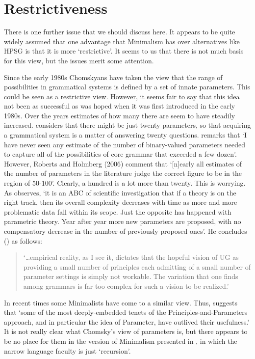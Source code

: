 \documentclass[output=paper]{langsci/langscibook}
\begin{document}
\section{Restrictiveness}
\label{sec:min-restrictive}

There is one further issue that we should discuss here. It appears to be quite widely assumed that one advantage that Minimalism has over alternatives like HPSG is that it is more `restrictive'. It seems to us that there is not much basis for this view, but the issues merit some attention.

Since the early 1980s Chomskyans have taken the view that the range of possibilities in grammatical systems is defined by a set of innate parameters. This could be seen as a restrictive view. However, it seems fair to say that this idea not been as successful as was hoped when it was first introduced in the early 1980s. Over the years estimates of how many there are seem to have steadily increased. \citet{Fodor.2001b} considers that there might be just twenty parameters, so that acquiring a grammatical system is a matter of answering twenty questions. \citet[44]{Newmeyer2005a} remarks that `I have never seen any estimate of the number of binary-valued parameters needed to capture all of the possibilities of core grammar that exceeded a few dozen'. However, Roberts and Holmberg (2006) comment that `[n]early all estimates of the number of parameters in the literature judge the correct figure to be in the region of 50-100'. Clearly, a hundred is a lot more than twenty. This is worrying. As \citet{Newmeyer.2006} observes, `it is an ABC of scientific investigation that if a theory is on the right track, then its overall complexity decreases with time as more and more problematic data fall within its scope. Just the opposite has happened with parametric theory. Year after year more new parameters are proposed, with no compensatory decrease in the number of previously proposed ones'. He concludes (\citeyear[75]{Newmeyer2005a}) as follows:
\begin{quote}
	`\ldots{}empirical reality, as I see it, dictates that the hopeful vision of UG as providing a small number of principles each admitting of a small number of parameter settings is simply not workable. The variation that one finds among grammars is far too complex for such a vision to be realized.' 
\end{quote}
In recent times some Minimalists have come to a similar view. Thus, \citet{Boeckx.2011} suggests that `some of the most deeply-embedded tenets of the Principles-and-Parameters approach, and in particular the idea of Parameter, have outlived their usefulness.'  It is not really clear what  Chomsky's view of parameters is, but there appears to be no place for them in the version of Minimalism presented in \citet{HCF2002a}, in which the narrow language faculty is just `recursion'. 
\end{document}
